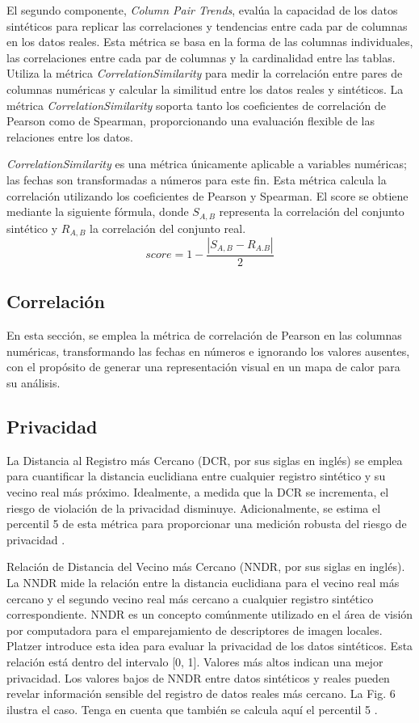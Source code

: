 El segundo componente, \emph{Column Pair Trends}, evalúa la capacidad de los datos sintéticos para replicar las correlaciones y tendencias entre cada par de columnas en los datos reales. Esta métrica se basa en la forma de las columnas individuales, las correlaciones entre cada par de columnas y la cardinalidad entre las tablas. Utiliza la métrica \emph{CorrelationSimilarity} para medir la correlación entre pares de columnas numéricas y calcular la similitud entre los datos reales y sintéticos. La métrica \emph{CorrelationSimilarity} soporta tanto los coeficientes de correlación de Pearson como de Spearman, proporcionando una evaluación flexible de las relaciones entre los datos.


\emph{CorrelationSimilarity} es una métrica únicamente aplicable a variables numéricas; las fechas son transformadas a números para este fin. Esta métrica calcula la correlación utilizando los coeficientes de Pearson y Spearman. El score se obtiene mediante la siguiente fórmula, donde $S_{A,B}$ representa la correlación del conjunto sintético y $R_{A,B}$ la correlación del conjunto real.
\[
score = 1 - \frac{|S_{A,B} - R_{A.B}|}{2}
\]


\subsection{Correlación}
En esta sección, se emplea la métrica de correlación de Pearson en las columnas numéricas, transformando las fechas en números e ignorando los valores ausentes, con el propósito de generar una representación visual en un mapa de calor para su análisis.


\subsection{Privacidad}
La Distancia al Registro más Cercano (DCR, por sus siglas en inglés) se emplea para cuantificar la distancia euclidiana entre cualquier registro sintético y su vecino real más próximo. Idealmente, a medida que la DCR se incrementa, el riesgo de violación de la privacidad disminuye. Adicionalmente, se estima el percentil 5 de esta métrica para proporcionar una medición robusta del riesgo de privacidad \cite{zhao_ctab-gan_2021}.

Relación de Distancia del Vecino más Cercano (NNDR, por sus siglas en inglés). La NNDR mide la relación entre la distancia euclidiana para el vecino real más cercano y el segundo vecino real más cercano a cualquier registro sintético correspondiente. NNDR es un concepto comúnmente utilizado en el área de visión por computadora para el emparejamiento de descriptores de imagen locales. Platzer \cite{noauthor_virtual_2022} introduce esta idea para evaluar la privacidad de los datos sintéticos. Esta relación está dentro del intervalo [0, 1]. Valores más altos indican una mejor privacidad. Los valores bajos de NNDR entre datos sintéticos y reales pueden revelar información sensible del registro de datos reales más cercano. La Fig. 6 ilustra el caso. Tenga en cuenta que también se calcula aquí el percentil 5 \cite{zhao_ctab-gan_2021}.

